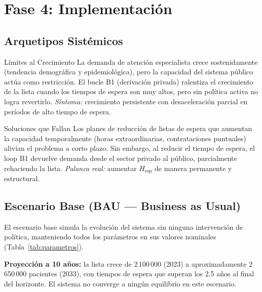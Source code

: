 \documentclass[12pt,a4paper]{article}
\begin{document}
\section{Fase 4: Implementación}

\label{sec:arquetipos}

\subsection{Arquetipos Sistémicos}

\begin{arquetipobox}{Límites al Crecimiento}
La demanda de atención especialista crece sostenidamente (tendencia demográfica y epidemiológica), pero la capacidad del sistema público actúa como restricción. El bucle B1 (derivación privada) ralentiza el crecimiento de la lista cuando los tiempos de espera son muy altos, pero sin política activa no logra revertirlo. \textit{Síntoma:} crecimiento persistente con desaceleración parcial en períodos de alto tiempo de espera.
\end{arquetipobox}

\begin{arquetipobox}{Soluciones que Fallan}
Los planes de reducción de listas de espera que aumentan la capacidad temporalmente (horas extraordinarias, contrataciones puntuales) alivian el problema a corto plazo. Sin embargo, al reducir el tiempo de espera, el loop B1 devuelve demanda desde el sector privado al público, parcialmente rehaciendo la lista. \textit{Palanca real:} aumentar $H_{\text{esp}}$ de manera permanente y estructural.
\end{arquetipobox}

\subsection{Escenario Base (BAU — Business as Usual)}

El escenario base simula la evolución del sistema sin ninguna intervención de política, manteniendo todos los parámetros en sus valores nominales (Tabla~\ref{tab:parametros}).

\textbf{Proyección a 10 años:} la lista crece de 2\,100\,000 (2023) a aproximadamente 2\,650\,000 pacientes (2033), con tiempos de espera que superan los 2.5 años al final del horizonte. El sistema no converge a ningún equilibrio en este escenario.
\end{document}
